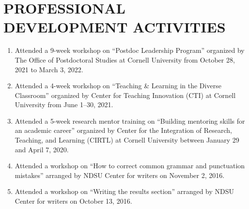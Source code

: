 \documentclass[11pt]{article}
\begin{document}
\section*{PROFESSIONAL DEVELOPMENT ACTIVITIES}
\begin{enumerate}[itemsep=-0.8ex]
\item Attended a 9-week workshop on ``Postdoc Leadership Program'' organized by The Office of Postdoctoral Studies at Cornell University from October 28, 2021 to March 3, 2022. 

\item Attended a 4-week workshop on ``Teaching \& Learning in the Diverse Classroom'' organized by Center for Teaching Innovation (CTI) at Cornell University from June 1--30, 2021. 

\item Attended a 5-week research mentor training on ``Building mentoring skills for an academic career'' organized by Center for the Integration of Research, Teaching, and Learning (CIRTL) at Cornell University between January 29 and April 7, 2020. 
%


\item Attended a workshop on ``How to correct common grammar and punctuation mistakes'' arranged by NDSU Center for writers on November 2, 2016. 

\item Attended a workshop on ``Writing the results section'' arranged by NDSU Center for writers on October 13, 2016. 



\end{enumerate}

\end{document}

